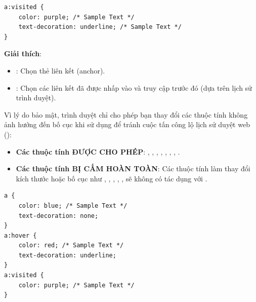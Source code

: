\begin{conceptBox}
\begin{codeWindow}
\begin{lstlisting}[language=CSS3]
a:visited {
    color: purple; /* Sample Text */
    text-decoration: underline; /* Sample Text */
}
\end{lstlisting}
\end{codeWindow}
\textbf{Giải thích}:
\begin{itemize}[leftmargin=1.5em, itemsep=2pt, parsep=0pt]
    \item {}: Chọn thẻ liên kết (anchor).
    \item {}: Chọn các liên kết đã được nhấp vào và truy cập trước đó (dựa trên lịch sử trình duyệt).
\end{itemize}
\end{conceptBox}

\begin{warnBox}
Vì lý do bảo mật, trình duyệt chỉ cho phép bạn thay đổi các thuộc tính không ảnh hưởng đến bố cục khi sử dụng  để tránh cuộc tấn công lộ lịch sử duyệt web ():
\begin{itemize}[leftmargin=1.5em, itemsep=2pt, parsep=0pt]
    \item \textbf{Các thuộc tính ĐƯỢC CHO PHÉP}: , , , , , , , .
    \item \textbf{Các thuộc tính BỊ CẤM HOÀN TOÀN}: Các thuộc tính làm thay đổi kích thước hoặc bố cục như , , , , ,  sẽ không có tác dụng với .
\end{itemize}
\end{warnBox}

\begin{codeWindow}
\begin{lstlisting}[language=CSS3]
a {
    color: blue; /* Sample Text */
    text-decoration: none;
}
a:hover {
    color: red; /* Sample Text */
    text-decoration: underline;
}
a:visited {
    color: purple; /* Sample Text */
}
\end{lstlisting}
\end{codeWindow}

